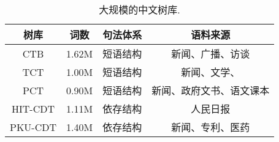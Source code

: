 \begin{table}[tb]
    \centering
    \begin{tabular}{c c c c}
        \toprule
        树库    & 词数  & 句法体系 & 语料来源                 \\%
        \hline
        CTB     & 1.62M & 短语结构 & 新闻、广播、访谈         \\
        TCT     & 1.00M & 短语结构 & 新闻、文学、             \\
        PCT     & 0.90M & 短语结构 & 新闻、政府文书、语文课本 \\
        \hline
        HIT-CDT & 1.11M & 依存结构 & 人民日报                 \\
        PKU-CDT & 1.40M & 依存结构 & 新闻、专利、医药         \\
        \bottomrule
    \end{tabular}
    \caption{大规模的中文树库. %
    }
    \label{tb:treebanks}
\end{table}

